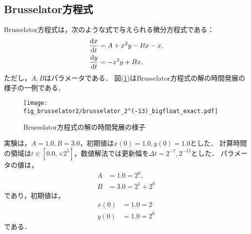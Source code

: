 \subsection{Brusselator方程式}
Brusselator方程式は，次のような式で与えられる微分方程式である：
\begin{align}
    \frac{\mathrm{d}x}{\mathrm{d}t} &= A + x^2y - Bx - x,\\
    \frac{\mathrm{d}y}{\mathrm{d}t} &= -x^2y + Bx.
\end{align}
ただし，$A,B$はパラメータである．
図(\ref{fig:brusselator})はBrusselator方程式の解の時間発展の様子の一例である．
\begin{figure}[H]
    \centering
    \begin{minipage}[b]{0.9\columnwidth}
            \texttt{[image: fig\_brusselator2/brusselator\_2^(-13)\_bigfloat\_exact.pdf]}
    \end{minipage}
    \caption{Bruesslator方程式の解の時間発展の様子}
    \label{fig:brusselator}
\end{figure}
実験は，$A=1.0, B=3.0$，初期値は$x(0) = 1.0, y(0) = 1.0$とした．
計算時間の領域は$t \in [0.0, \times 2^5]$，数値解法では更新幅を$\Delta t =  2^{-7}, 2^{-13}$とした．
パラメータの値は，
\begin{align}
    A &= 1.0 = 2^0, \\
    B &= 3.0 = 2^1 + 2^0
\end{align}
であり，初期値は，
\begin{align}
    x(0) &= 1.0 = 2^, \\
    y(0) &= 1.0 = 2^0
\end{align} 
である．
